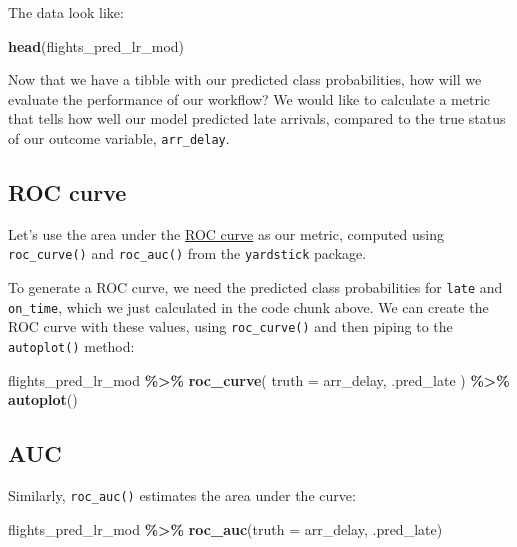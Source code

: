 \documentclass[
]{book}
\newenvironment{Shaded}{\begin{snugshade}}{\end{snugshade}}
\newcommand{\DataTypeTok}[1]{\textcolor[rgb]{0.13,0.29,0.53}{#1}}
\newcommand{\KeywordTok}[1]{\textcolor[rgb]{0.13,0.29,0.53}{\textbf{#1}}}
\newcommand{\NormalTok}[1]{#1}
\newcommand{\OperatorTok}[1]{\textcolor[rgb]{0.81,0.36,0.00}{\textbf{#1}}}
\newcommand{\StringTok}[1]{\textcolor[rgb]{0.31,0.60,0.02}{#1}}
\begin{document}
The data look like:

\begin{Shaded}
\begin{Highlighting}[]
\KeywordTok{head}\NormalTok{(flights\_pred\_lr\_mod)}
\end{Highlighting}
\end{Shaded}

Now that we have a tibble with our predicted class probabilities, how will we evaluate the performance of our workflow? We would like to calculate a metric that tells how well our model predicted late arrivals, compared to the true status of our outcome variable, \texttt{arr\_delay}.

\hypertarget{roc-curve}{%
\subsection{ROC curve}\label{roc-curve}}

Let's use the area under the \href{https://bookdown.org/max/FES/measuring-performance.html\#class-metrics}{ROC curve} as our metric, computed using \texttt{roc\_curve()} and \texttt{roc\_auc()} from the \texttt{yardstick} package.

To generate a ROC curve, we need the predicted class probabilities for \texttt{late} and \texttt{on\_time}, which we just calculated in the code chunk above. We can create the ROC curve with these values, using \texttt{roc\_curve()} and then piping to the \texttt{autoplot()} method:

\begin{Shaded}
\begin{Highlighting}[]
\NormalTok{flights\_pred\_lr\_mod }\OperatorTok{\%\textgreater{}\%}
\StringTok{  }\KeywordTok{roc\_curve}\NormalTok{(}
    \DataTypeTok{truth =}\NormalTok{ arr\_delay,}
\NormalTok{    .pred\_late}
\NormalTok{  ) }\OperatorTok{\%\textgreater{}\%}
\StringTok{  }\KeywordTok{autoplot}\NormalTok{()}
\end{Highlighting}
\end{Shaded}

\hypertarget{auc}{%
\subsection{AUC}\label{auc}}

Similarly, \texttt{roc\_auc()} estimates the area under the curve:

\begin{Shaded}
\begin{Highlighting}[]
\NormalTok{flights\_pred\_lr\_mod }\OperatorTok{\%\textgreater{}\%}
\StringTok{  }\KeywordTok{roc\_auc}\NormalTok{(}\DataTypeTok{truth =}\NormalTok{ arr\_delay, .pred\_late)}
\end{Highlighting}
\end{Shaded}
\end{document}
